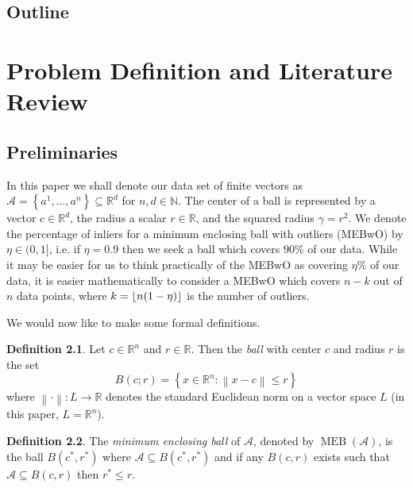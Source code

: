\documentclass[11pt,twoside]{report}
\newcommand{\A}{\mathcal{A}} %
\newcommand{\norm}[1]{\left\lVert#1\right\rVert} %
\DeclareMathOperator{\MEB}{MEB}
\DeclarePairedDelimiter\floor{\lfloor}{\rfloor}
\theoremstyle{definition}
\newtheorem{definition}{Definition}
\numberwithin{theorem}{section}
\numberwithin{definition}{section}
\numberwithin{lemma}{section}
\numberwithin{proposition}{section}
\numberwithin{equation}{section}
\numberwithin{figure}{section}
\begin{document}
\section{Outline}

\chapter{Problem Definition and Literature Review}\label{exact}
\section{Preliminaries}
In this paper we shall denote our data set of finite vectors as $\mathcal{A} = \left\{a^1,\ldots,a^n\right\}\subseteq\mathbb{R}^d$ for $n,d\in\mathbb{N}$. The center of a ball is represented by a vector $c\in\mathbb{R}^d$, the radius a scalar $r\in\mathbb{R}$, and the squared radius $\gamma=r^2$. We denote the percentage of inliers for a minimum enclosing ball with outliers (MEBwO) by $\eta\in(0,1]$, i.e. if $\eta=0.9$ then we seek a ball which covers $90\%$ of our data. While it may be easier for us to think practically of the MEBwO as covering $\eta\%$ of our data, it is easier mathematically to consider a MEBwO which covers $n-k$ out of $n$ data points, where $k=\floor{n(1-\eta)}$ is the number of outliers.

We would now like to make some formal definitions.

\begin{definition}
    Let $c\in\mathbb{R}^n$ and $r\in\mathbb{R}$. Then the \textit{ball} with center $c$ and radius $r$ is the set
    \begin{equation*}
        B(c;r) = \left\{x\in\mathbb{R}^n : \norm{x-c} \leq r\right\}
    \end{equation*}
    where $\norm{\cdot}:L\to\mathbb{R}$ denotes the standard Euclidean norm on a vector space $L$ (in this paper, $L=\mathbb{R}^n$).
\end{definition}

\begin{definition}
    The \textit{minimum enclosing ball} of $\A$, denoted by $\MEB(\A)$, is the ball $B(c^*,r^*)$ where $\A\subseteq B(c^*,r^*)$ and if any $B(c,r)$ exists such that $\mathcal{A}\subseteq B(c,r)$ then $r^*\leq r$.
\end{definition}
\end{document}
